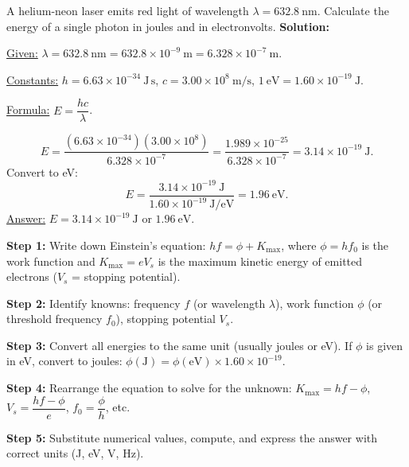 \documentclass[11pt]{article}
\begin{document}
\begin{exoresolu}
A helium-neon laser emits red light of wavelength $\lambda = 632.8\ \mathrm{nm}$. Calculate the energy of a single photon in joules and in electronvolts.
\tcblower
\textbf{Solution:}\par
\underline{Given:} $\lambda = 632.8\ \mathrm{nm} = 632.8\times10^{-9}\ \mathrm{m} = 6.328\times10^{-7}\ \mathrm{m}$.\par
\underline{Constants:} $h = 6.63\times10^{-34}\ \mathrm{J\,s}$, $c = 3.00\times10^8\ \mathrm{m/s}$, $1\ \mathrm{eV} = 1.60\times10^{-19}\ \mathrm{J}$.\par
\underline{Formula:} $E = \dfrac{hc}{\lambda}$.\par
\[
E = \frac{(6.63\times10^{-34})(3.00\times10^8)}{6.328\times10^{-7}}
   = \frac{1.989\times10^{-25}}{6.328\times10^{-7}}
   = 3.14\times10^{-19}\ \mathrm{J}.
\]
Convert to eV:
\[
E = \frac{3.14\times10^{-19}\ \mathrm{J}}{1.60\times10^{-19}\ \mathrm{J/eV}} = 1.96\ \mathrm{eV}.
\]
\underline{Answer:} $E = 3.14\times10^{-19}\ \mathrm{J}$ or $1.96\ \mathrm{eV}$.
\end{exoresolu}

\begin{methode}
\textbf{Step 1:} Write down Einstein's equation: $hf = \phi + K_{\max}$, where $\phi = hf_0$ is the work function and $K_{\max} = eV_s$ is the maximum kinetic energy of emitted electrons ($V_s$ = stopping potential).\par
\textbf{Step 2:} Identify knowns: frequency $f$ (or wavelength $\lambda$), work function $\phi$ (or threshold frequency $f_0$), stopping potential $V_s$.\par
\textbf{Step 3:} Convert all energies to the same unit (usually joules or eV). If $\phi$ is given in eV, convert to joules: $\phi(\mathrm{J}) = \phi(\mathrm{eV}) \times 1.60\times10^{-19}$.\par
\textbf{Step 4:} Rearrange the equation to solve for the unknown: $K_{\max} = hf - \phi$, $V_s = \dfrac{hf - \phi}{e}$, $f_0 = \dfrac{\phi}{h}$, etc.\par
\textbf{Step 5:} Substitute numerical values, compute, and express the answer with correct units (J, eV, V, Hz).
\end{methode}
\end{document}
